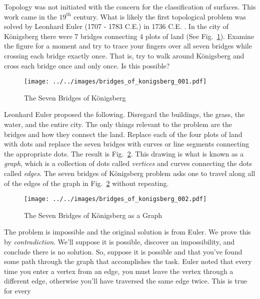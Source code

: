     Topology was not initiated with the concern for the classification of
    surfaces. This work came in the $19^{\textrm{th}}$ century. What is likely
    the first topological problem was solved by Leonhard Euler
    (1707 - 1783 C.E.) in 1736 C.E. \cite{LeonhardEulerBridgesOfKonigsberg}. In
    the city of K\"{o}nigsberg there were 7 bridges connecting 4 plots of land
    (See Fig.~\ref{fig:bridges_of_konigsberg_001}). Examine the figure for a
    moment and try to trace your fingers over all seven bridges while crossing
    each bridge exactly once. That is, try to walk around K\"{o}nigsberg and
    cross each bridge once and only once. Is this possible?
    \begin{figure}
        \centering
        \texttt{[image: ../../images/bridges\_of\_konigsberg\_001.pdf]}
        \caption{The Seven Bridges of K\"{o}nigsberg}
        \label{fig:bridges_of_konigsberg_001}
    \end{figure}
    Leonhard Euler proposed the following. Disregard the buildings, the grass,
    the water, and the entire city. The only things relevant to the problem are
    the bridges and how they connect the land. Replace each of the four plots
    of land with dots and replace the seven bridges with curves or
    line segments connecting the appropriate dots. The result is
    Fig.~\ref{fig:bridges_of_konigsberg_002}. This drawing is what is known as
    a \textit{graph}, which is a collection of dots called
    \textit{vertices} and curves connecting the dots called
    \textit{edges}. The seven bridges of K\"{o}nigsberg problem asks one to
    travel along all of the edges of the graph in
    Fig.~\ref{fig:bridges_of_konigsberg_002} without repeating.
    \par\hfill\par
    \begin{figure}
        \centering
        \texttt{[image: ../../images/bridges\_of\_konigsberg\_002.pdf]}
        \caption{The Seven Bridges of K\"{o}nigsberg as a Graph}
        \label{fig:bridges_of_konigsberg_002}
    \end{figure}
    The problem is impossible and the original solution is from Euler. We prove
    this by \textit{contradiction}. We'll suppose it is possible, discover an
    impossibility, and conclude there is no solution. So, suppose
    it is possible and that you've found some path through the graph that
    accomplishes the task. Euler noted that every time you enter a vertex from
    an edge, you must leave the vertex through a different edge,
    otherwise you'll have traversed the same edge twice. This is true for every
